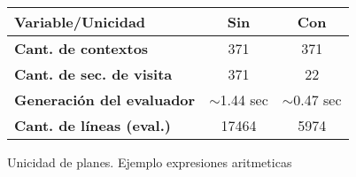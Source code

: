 \begin{figure}[h!]
    \begin{center}
        \setlength{\doublerulesep}{0mm}
        \setlength{\arrayrulewidth}{0.9pt}
        \begin{tabular}{|l||c|c|}
            \hline
            \rowcolor{gris} \textbf{Variable/Unicidad}&\textbf{Sin} & \textbf{Con} \\ \hline
            \rowcolor{white}\textbf{Cant. de contextos}           & 371                        & 371                         \\ \hline
            \rowcolor{white}\textbf{Cant. de sec. de visita }  & \color{red}371             & \color{blue}22              \\ \hline
            \rowcolor{white}\textbf{Generación del evaluador}  & \color{red} $\sim$1.44 sec & \color{blue} $\sim$0.47 sec \\ \hline
            \rowcolor{white}\textbf{Cant. de líneas (eval.)}   & \color{red}17464           & \color{blue}5974            \\ \hline
        \end{tabular}
    \end{center}
    \caption{\label{fig:uni_plan}Unicidad de planes. Ejemplo expresiones aritmeticas}
\end{figure}
